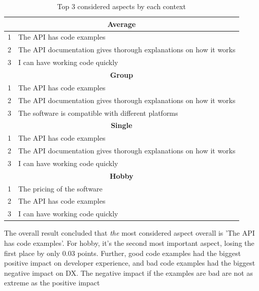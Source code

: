 \documentclass{cslthse-msc}
\begin{document}
    \begin{table}[H]
        \centering
        \caption{Top 3 considered aspects by each context}
        \label{tabl:top3}
        \begin{tabular}{r l}
            \hline\hline
            \multicolumn{2}{c}{\textbf{Average}} \\ \hline
            1 &The API has code examples \\
            2 & The API documentation gives thorough explanations on how it works \\
            3 &I can have working code quickly \\
            \hline\hline
            \multicolumn{2}{c}{\textbf{Group}} \\ \hline
            1 & The API has code examples                                        \\
            2 & The API documentation gives thorough explanations on how it works \\
            3 & The software is compatible with different platforms              \\
            \hline\hline
            \multicolumn{2}{c}{\textbf{Single}} \\ \hline
            1 &  The API has code examples                                         \\
            2 &  The API documentation gives thorough explanations on how it works  \\
            3 &  I can have working code quickly                                   \\
            \hline\hline
            \multicolumn{2}{c}{\textbf{Hobby}} \\ \hline
            1 & The pricing of the software    \\
            2 & The API has code examples       \\
            3 & I can have working code quickly\\ \hline
        \end{tabular}
    \end{table}
    The overall result concluded that \textit{the} most considered aspect overall
    is 'The API has code examples'. For hobby, it's the second most
    important aspect, losing the first place by only 0.03 points.
    Further, good code
    examples had the biggest positive impact on developer experience, and
    bad code examples had the biggest negative impact on DX. The negative
    impact if the examples are bad are not as extreme as the positive impact
\end{document}
